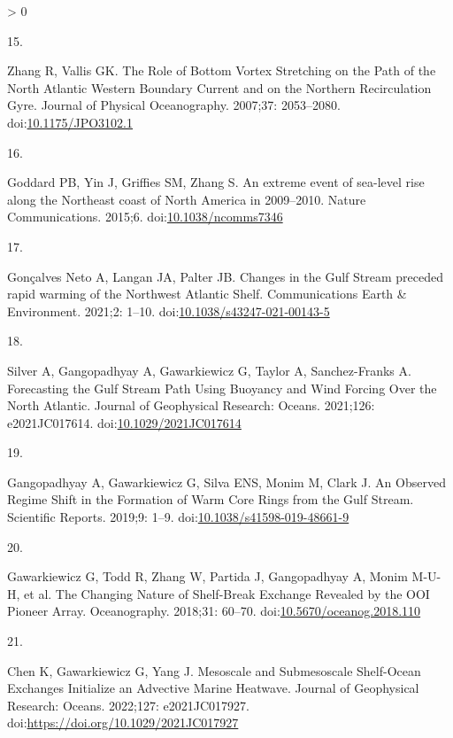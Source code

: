 \documentclass[
  10pt,
]{article}
\newlength{\cslhangindent}
\newlength{\csllabelwidth}
\newenvironment{CSLReferences}[2] %
 {%
  \setlength{\parindent}{0pt}
  \ifodd #1 \everypar{\setlength{\hangindent}{\cslhangindent}}\ignorespaces\fi
  \ifnum #2 > 0
  \setlength{\parskip}{#2\baselineskip}
  \fi
 }%
 {}
\newcommand{\CSLLeftMargin}[1]{\parbox[t]{\csllabelwidth}{#1}}
\newcommand{\CSLRightInline}[1]{\parbox[t]{\linewidth - \csllabelwidth}{#1}\break}
\begin{document}
\begin{CSLReferences}{0}{0}
\leavevmode\hypertarget{ref-zhang_role_2007}{}%
\CSLLeftMargin{15. }
\CSLRightInline{Zhang R, Vallis GK. The {Role} of {Bottom} {Vortex}
{Stretching} on the {Path} of the {North} {Atlantic} {Western}
{Boundary} {Current} and on the {Northern} {Recirculation} {Gyre}.
Journal of Physical Oceanography. 2007;37: 2053--2080.
doi:\href{https://doi.org/10.1175/JPO3102.1}{10.1175/JPO3102.1}}

\leavevmode\hypertarget{ref-goddard_extreme_2015}{}%
\CSLLeftMargin{16. }
\CSLRightInline{Goddard PB, Yin J, Griffies SM, Zhang S. An extreme
event of sea-level rise along the {Northeast} coast of {North} {America}
in 2009--2010. Nature Communications. 2015;6.
doi:\href{https://doi.org/10.1038/ncomms7346}{10.1038/ncomms7346}}

\leavevmode\hypertarget{ref-goncalves_neto_changes_2021}{}%
\CSLLeftMargin{17. }
\CSLRightInline{Gonçalves Neto A, Langan JA, Palter JB. Changes in the
{Gulf} {Stream} preceded rapid warming of the {Northwest} {Atlantic}
{Shelf}. Communications Earth \& Environment. 2021;2: 1--10.
doi:\href{https://doi.org/10.1038/s43247-021-00143-5}{10.1038/s43247-021-00143-5}}

\leavevmode\hypertarget{ref-silver_forecasting_2021}{}%
\CSLLeftMargin{18. }
\CSLRightInline{Silver A, Gangopadhyay A, Gawarkiewicz G, Taylor A,
Sanchez-Franks A. Forecasting the {Gulf} {Stream} {Path} {Using}
{Buoyancy} and {Wind} {Forcing} {Over} the {North} {Atlantic}. Journal
of Geophysical Research: Oceans. 2021;126: e2021JC017614.
doi:\href{https://doi.org/10.1029/2021JC017614}{10.1029/2021JC017614}}

\leavevmode\hypertarget{ref-gangopadhyay_observed_2019}{}%
\CSLLeftMargin{19. }
\CSLRightInline{Gangopadhyay A, Gawarkiewicz G, Silva ENS, Monim M,
Clark J. An {Observed} {Regime} {Shift} in the {Formation} of {Warm}
{Core} {Rings} from the {Gulf} {Stream}. Scientific Reports. 2019;9:
1--9.
doi:\href{https://doi.org/10.1038/s41598-019-48661-9}{10.1038/s41598-019-48661-9}}

\leavevmode\hypertarget{ref-gawarkiewicz_changing_2018}{}%
\CSLLeftMargin{20. }
\CSLRightInline{Gawarkiewicz G, Todd R, Zhang W, Partida J, Gangopadhyay
A, Monim M-U-H, et al. The {Changing} {Nature} of {Shelf}-{Break}
{Exchange} {Revealed} by the {OOI} {Pioneer} {Array}. Oceanography.
2018;31: 60--70.
doi:\href{https://doi.org/10.5670/oceanog.2018.110}{10.5670/oceanog.2018.110}}

\leavevmode\hypertarget{ref-chen_mesoscale_2022}{}%
\CSLLeftMargin{21. }
\CSLRightInline{Chen K, Gawarkiewicz G, Yang J. Mesoscale and
{Submesoscale} {Shelf}-{Ocean} {Exchanges} {Initialize} an {Advective}
{Marine} {Heatwave}. Journal of Geophysical Research: Oceans. 2022;127:
e2021JC017927. doi:\url{https://doi.org/10.1029/2021JC017927}}


\end{CSLReferences}
\end{document}
